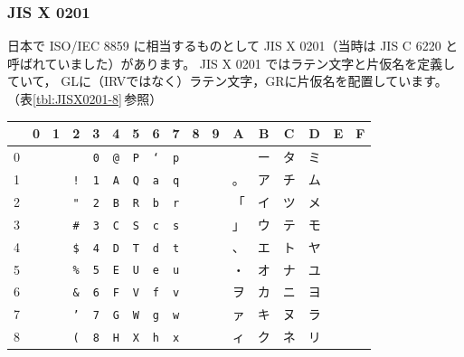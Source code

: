 \documentclass[a4j,10pt,fleqn,uplatex]{jsarticle}
\begin{document}
\subsubsection{JIS X 0201} \label{sec:JISX0201}

日本で ISO/IEC 8859 に相当するものとして JIS X 0201（当時は JIS C 6220 と呼ばれていました）があります。
JIS X 0201 ではラテン文字と片仮名を定義していて，
GLに（IRVではなく）ラテン文字，GRに片仮名を配置しています。
（表\ref{tbl:JISX0201-8}\,参照）

\begin{table}[htp]
\begin{center}\begin{tabular}{|c||c|c|c|c|c|c|c|c|c|c|c|c|c|c|c|c|}
    \hline
       & 0 & 1  & 2          & 3          & 4             & 5          & 6             & 7          & 8 & 9 & A  & B  & C  & D  & E & F \\ \hline \hline
    0  & ~ & ~  &            & \texttt{0} & \texttt{@}    & \texttt{P} & \texttt{`}    & \texttt{p} & ~ & ~ &    & ー & タ & ミ & ~ & ~ \\ \hline
    1  & ~ & ~  & \texttt{!} & \texttt{1} & \texttt{A}    & \texttt{Q} & \texttt{a}    & \texttt{q} & ~ & ~ & 。 & ア & チ & ム & ~ & ~ \\ \hline
    2  & ~ & ~  & \texttt{"} & \texttt{2} & \texttt{B}    & \texttt{R} & \texttt{b}    & \texttt{r} & ~ & ~ & 「 & イ & ツ & メ & ~ & ~ \\ \hline
    3  & ~ & ~ & \texttt{\#} & \texttt{3} & \texttt{C}    & \texttt{S} & \texttt{c}    & \texttt{s} & ~ & ~ & 」 & ウ & テ & モ & ~ & ~ \\ \hline
    4  & ~ & ~ & \texttt{\$} & \texttt{4} & \texttt{D}    & \texttt{T} & \texttt{d}    & \texttt{t} & ~ & ~ & 、 & エ & ト & ヤ & ~ & ~ \\ \hline
    5  & ~ & ~ & \texttt{\%} & \texttt{5} & \texttt{E}    & \texttt{U} & \texttt{e}    & \texttt{u} & ~ & ~ & ・ & オ & ナ & ユ & ~ & ~ \\ \hline
    6  & ~ & ~ & \texttt{\&} & \texttt{6} & \texttt{F}    & \texttt{V} & \texttt{f}    & \texttt{v} & ~ & ~ & ヲ & カ & ニ & ヨ & ~ & ~ \\ \hline
    7  & ~ & ~  & \texttt{'} & \texttt{7} & \texttt{G}    & \texttt{W} & \texttt{g}    & \texttt{w} & ~ & ~ & ァ & キ & ヌ & ラ & ~ & ~ \\ \hline
    8  & ~ & ~  & \texttt{(} & \texttt{8} & \texttt{H}    & \texttt{X} & \texttt{h}    & \texttt{x} & ~ & ~ & ィ & ク & ネ & リ & ~ & ~ \\ \hline

\end{tabular}
\end{center}
\end{table}
\end{document}
